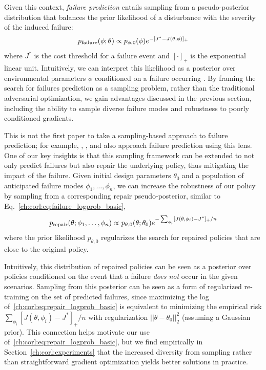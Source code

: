 Given this context, \textit{failure prediction} entails sampling from a pseudo-posterior distribution that balances the prior likelihood of a disturbance with the severity of the induced failure:
%
\begin{equation}
    p_{\rm{failure}}(\phi; \theta) \propto p_{\phi, 0}(\phi)e^{-[J^* - J(\theta, \phi)]_+} \label{ch:corl:eq:failure_logprob_basic}
\end{equation}
%
where $J^*$ is the cost threshold for a failure event and $[\cdot]_+$ is the exponential linear unit. Intuitively, we can interpret this likelihood as a posterior over environmental parameters $\phi$ conditioned on a failure occurring \cite{sinhaNeuralBridgeSampling2020,zhouRoCUSRobotController2021,maSamplingCanBe2019,dawsonBayesianApproachBreaking2023}. By framing the search for failures prediction as a sampling problem, rather than the traditional adversarial optimization, we gain advantages discussed in the previous section, including the ability to sample diverse failure modes and robustness to poorly conditioned gradients.

This is not the first paper to take a sampling-based approach to failure prediction; for example, \cite{okellyScalableEndtoEndAutonomous2018}, \cite{sinhaNeuralBridgeSampling2020}, and \cite{zhouRoCUSRobotController2021} also approach failure prediction using this lens. One of our key insights is that this sampling framework can be extended to not only predict failures but also repair the underlying policy, thus mitigating the impact of the failure.
%
Given initial design parameters $\theta_0$ and a population of anticipated failure modes $\phi_1, \ldots, \phi_n$, we can increase the robustness of our policy by sampling from a corresponding repair pseudo-posterior, similar to Eq.~\eqref{ch:corl:eq:failure_logprob_basic},
%
\begin{equation}
    p_{\rm{repair}}(\theta; \phi_1, \ldots, \phi_n) \propto p_{\theta, 0}(\theta; \theta_0)e^{-\sum_{\phi_i}[J(\theta, \phi_i) - J^*]_+ / n} \label{ch:corl:eq:repair_logprob_basic}
\end{equation}
%
where the prior likelihood $p_{\theta, 0}$ regularizes the search for repaired policies that are close to the original policy.

Intuitively, this distribution of repaired policies can be seen as a posterior over policies conditioned on the event that a failure \textit{does not} occur in the given scenarios. Sampling from this posterior can be seen as a form of regularized re-training on the set of predicted failures, since maximizing the log of~\eqref{ch:corl:eq:repair_logprob_basic} is equivalent to minimizing the empirical risk $\sum_{\phi_i}[J(\theta, \phi_i) - J^*]_+ / n$ with regularization $||\theta-\theta_0||_2^2$ (assuming a Gaussian prior). This connection helps motivate our use of~\eqref{ch:corl:eq:repair_logprob_basic}, but we find empirically in Section~\ref{ch:corl:experiments} that the increased diversity from sampling rather than straightforward gradient optimization yields better solutions in practice.

